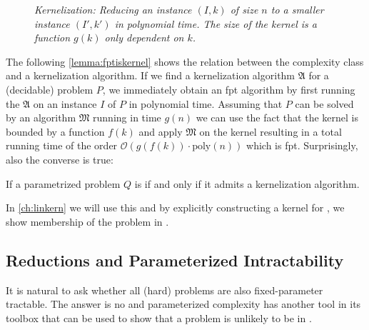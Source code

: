 
\begin{figure}
    \centering
    
    \caption{\textit{Kernelization: Reducing an instance $(I,k)$ of size $n$ to a smaller instance $(I', k')$ in polynomial time. The size of the kernel is a function $g(k)$ only dependent on $k$.}}
    \label{fig:kernelization}
\end{figure}


The following \cref{lemma:fptiskernel} shows the relation between the complexity class \FPT and a kernelization algorithm. 
If we find a kernelization algorithm $\mathfrak{A}$ for a (decidable) problem $P$, we immediately obtain an fpt algorithm by first running the $\mathfrak{A}$ on an instance $I$ of $P$ in polynomial time.
Assuming that $P$ can be solved by an algorithm $\mathfrak{M}$ running in time $g(n)$ we can use the fact that the kernel is bounded by a function $f(k)$ and apply $\mathfrak{M}$ on the kernel resulting in a  total running time of the order $\mathcal{O}(g(f(k)) \cdot \mathrm{poly}(n))$ which is fpt.
Surprisingly, also the converse is true:

\begin{lemma}\label{lemma:fptiskernel}
    If a parametrized problem $Q$ is \FPT if and only if it admits a kernelization algorithm.
\end{lemma}

 In \cref{ch:linkern} we will use this and by explicitly constructing a kernel for \psdom, we show membership of the problem in \FPT. 

\subsection{Reductions and Parameterized Intractability}

It is natural to ask whether all (hard) problems are also fixed-parameter tractable.
The answer is no and parameterized complexity has another tool in its toolbox that can be used to show that a problem is unlikely to be in \FPT.

